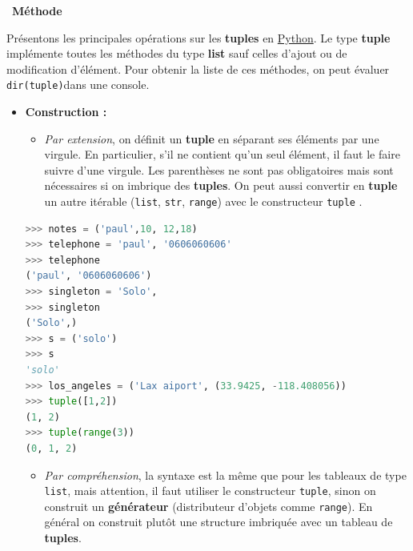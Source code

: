 \documentclass[
  11pt,
]{article}
\newcommand{\passthrough}[1]{#1}
\providecommand{\tightlist}{%
  \setlength{\itemsep}{0pt}\setlength{\parskip}{0pt}}
\newenvironment{methode}[1]
{\par \medskip    \noindent  
 \begin {bclogo}[arrondi =0.1,logo=\bcoutil, marge=4,noborder = true] {~\textbf{Méthode}   {\itshape #1} }  \par}
{
\end{bclogo}
 \par \bigskip }
\begin{document}
\begin{methode}{}

Présentons les principales opérations sur les \textbf{tuples} en
\href{https://docs.python.org/3/tutorial/datastructures.html}{Python}.
Le type \textbf{tuple} implémente toutes les méthodes du type
\textbf{list} sauf celles d'ajout ou de modification d'élément. Pour
obtenir la liste de ces méthodes, on peut évaluer
\passthrough{\lstinline!dir(tuple)!}dans une console.

\begin{itemize}
\tightlist
\item
  \textbf{Construction :}

  \begin{itemize}
  \tightlist
  \item
    \emph{Par extension}, on définit un \textbf{tuple} en séparant ses
    éléments par une virgule. En particulier, s'il ne contient qu'un
    seul élément, il faut le faire suivre d'une virgule. Les parenthèses
    ne sont pas obligatoires mais sont nécessaires si on imbrique des
    \textbf{tuples}. On peut aussi convertir en \textbf{tuple} un autre
    itérable (\passthrough{\lstinline!list!},
    \passthrough{\lstinline!str!}, \passthrough{\lstinline!range!}) avec
    le constructeur \passthrough{\lstinline!tuple!} .
  \end{itemize}

\begin{lstlisting}[language=Python]
>>> notes = ('paul',10, 12,18)
>>> telephone = 'paul', '0606060606'
>>> telephone
('paul', '0606060606')
>>> singleton = 'Solo',
>>> singleton
('Solo',)
>>> s = ('solo')
>>> s
'solo'
>>> los_angeles = ('Lax aiport', (33.9425, -118.408056))
>>> tuple([1,2])
(1, 2)
>>> tuple(range(3))
(0, 1, 2)
\end{lstlisting}

  \begin{itemize}
  \tightlist
  \item
    \emph{Par compréhension}, la syntaxe est la même que pour les
    tableaux de type \passthrough{\lstinline!list!}, mais attention, il
    faut utiliser le constructeur \passthrough{\lstinline!tuple!}, sinon
    on construit un \textbf{générateur} (distributeur d'objets comme
    \passthrough{\lstinline!range!}). En général on construit plutôt une
    structure imbriquée avec un tableau de \textbf{tuples}.
  \end{itemize}


\end{itemize}
\end{methode}
\end{document}
